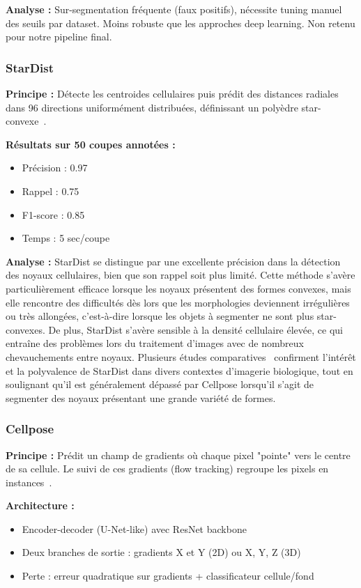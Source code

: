 \textbf{Analyse :}
Sur-segmentation fréquente (faux positifs), nécessite tuning manuel des seuils par dataset. Moins robuste que les approches deep learning. Non retenu pour notre pipeline final.

\subsubsection{StarDist}

\textbf{Principe :}
Détecte les centroides cellulaires puis prédit des distances radiales dans 96 directions uniformément distribuées, définissant un polyèdre star-convexe~\cite{Schmidt2018}.

\textbf{Résultats sur 50 coupes annotées :}
\begin{itemize}
    \item Précision : 0.97
    \item Rappel : 0.75
    \item F1-score : 0.85
    \item Temps : 5 sec/coupe
\end{itemize}

\textbf{Analyse :}
StarDist se distingue par une excellente précision dans la détection des noyaux cellulaires, bien que son rappel soit plus limité. Cette méthode s’avère particulièrement efficace lorsque les noyaux présentent des formes convexes, mais elle rencontre des difficultés dès lors que les morphologies deviennent irrégulières ou très allongées, c’est-à-dire lorsque les objets à segmenter ne sont plus star-convexes. De plus, StarDist s’avère sensible à la densité cellulaire élevée, ce qui entraîne des problèmes lors du traitement d’images avec de nombreux chevauchements entre noyaux. Plusieurs études comparatives~\cite{Weigert2022,Kleinberg2022} confirment l’intérêt et la polyvalence de StarDist dans divers contextes d’imagerie biologique, tout en soulignant qu’il est généralement dépassé par Cellpose lorsqu’il s’agit de segmenter des noyaux présentant une grande variété de formes.

\subsubsection{Cellpose}

\textbf{Principe :}
Prédit un champ de gradients où chaque pixel "pointe" vers le centre de sa cellule. Le suivi de ces gradients (flow tracking) regroupe les pixels en instances~\cite{Stringer2021}.

\textbf{Architecture :}
\begin{itemize}
    \item Encoder-decoder (U-Net-like) avec ResNet backbone
    \item Deux branches de sortie : gradients X et Y (2D) ou X, Y, Z (3D)
    \item Perte : erreur quadratique sur gradients + classificateur cellule/fond
\end{itemize}

